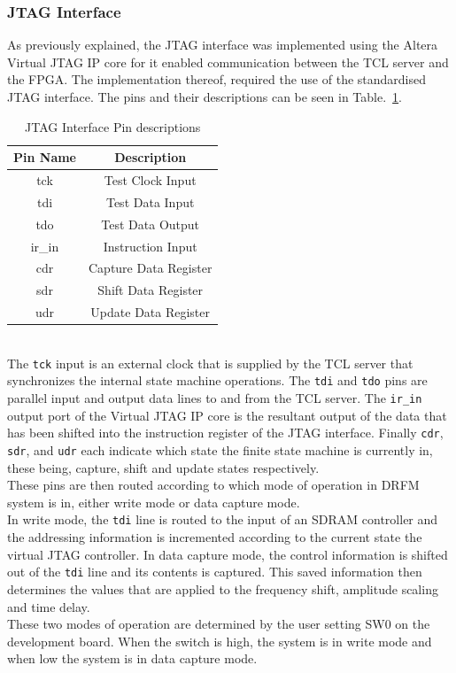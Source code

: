 		\subsubsection{JTAG Interface}
		As previously explained, the JTAG interface was implemented using the Altera Virtual JTAG IP core for it enabled communication between the TCL server and the FPGA. The implementation thereof, required the use of the standardised JTAG interface. The pins and their descriptions can be seen in Table.~\ref{tab:JTAG_info}.
		\begin{table}[h!]
			\centering
			\caption{JTAG Interface Pin descriptions}
			\begin{tabular}{|c|c|}
				\hline
				\textbf{Pin Name} & \textbf{Description} \\ 
				\hline
				tck 	& Test Clock Input  \\
				\hline
				tdi    	& Test Data Input \\
				\hline
				tdo    	& Test Data Output\\
				\hline
				ir\_in  & Instruction Input\\
				\hline
				cdr   	& Capture Data Register\\
				\hline
				sdr  	& Shift Data Register\\	
				\hline
				udr 	& Update Data Register \\
				\hline
			\end{tabular}
			\label{tab:JTAG_info}
		\end{table}
		 \\ \newline The \texttt{tck} input is an external clock that is supplied by the TCL server that synchronizes the internal state machine operations. The \texttt{tdi} and \texttt{tdo} pins are parallel input and output data lines to and from the TCL server. The \texttt{ir\_in} output port of the Virtual JTAG IP core is the resultant output of the data that has been shifted into the instruction register of the JTAG interface. Finally \texttt{cdr}, \texttt{sdr}, and \texttt{udr} each indicate which state the finite state machine is currently in, these being, capture, shift and update states respectively\cite{JTAG}. \\ \newline These pins are then routed according to which mode of operation in DRFM system is in, either write mode or data capture mode.  \\ \newline In write mode, the \texttt{tdi} line is routed to the input of an SDRAM controller and the addressing information is incremented according to the current state the virtual JTAG controller. In data capture mode, the control information is shifted out of the \texttt{tdi} line and its contents is captured. This saved information then determines the values that are applied to the frequency shift, amplitude scaling and time delay. \\ \newline These two modes of operation are determined by the user setting SW0 on the development board. When the switch is high, the system is in write mode and when low the system is in data capture mode.   \\
		
